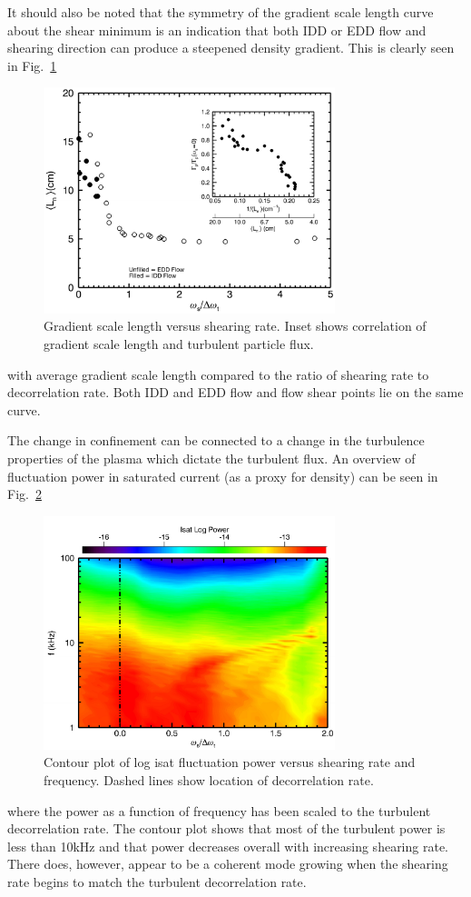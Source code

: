 \documentclass[%
 aps,
 prl,
 amsmath,amssymb,
 reprint,%
]{revtex4-1}
\begin{document}
It should also be noted that the symmetry of the gradient scale length curve about the shear minimum is an indication that both IDD or EDD flow and shearing direction can produce a steepened density gradient. This is clearly seen in
Fig.~\ref{fig:shearandgrad}
\begin{figure}
\begin{center}
\includegraphics[width=8.5cm]{shearandgrad.pdf}%
\end{center}
\caption{\label{fig:shearandgrad} Gradient scale length versus shearing rate. Inset shows correlation of gradient scale length and turbulent particle flux.}
\end{figure}
with average gradient scale length compared to the ratio of shearing rate to decorrelation rate. Both IDD and EDD flow and flow shear points lie on the same curve.

The change in confinement can be connected to a change in the turbulence properties of the plasma which dictate the turbulent flux. An overview of fluctuation power in saturated current (as a proxy for density) can be seen in 
Fig.~\ref{fig:powercontour}
\begin{figure}
\begin{center}
\includegraphics[width=8.5cm]{powercontour.pdf}%
\end{center}
\caption{\label{fig:powercontour} Contour plot of log isat fluctuation power versus shearing rate and frequency. Dashed lines show location of decorrelation rate.}
\end{figure}
where the power as a function of frequency has been scaled to the turbulent decorrelation rate. The contour plot shows that most of the turbulent power is less than 10kHz and that power decreases overall with increasing shearing rate. There does, however, appear to be a coherent mode growing when the shearing rate begins to match the turbulent decorrelation rate. 
\end{document}
